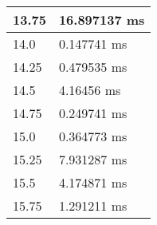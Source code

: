 \begin{multicols}{2}
\begin{tabular}{|l|l|}
		13.75 & 16.897137 ms \\ \hline
		14.0 & 0.147741 ms \\ \hline
		14.25 & 0.479535 ms \\ \hline
		14.5 & 4.16456 ms \\ \hline
		14.75 & 0.249741 ms \\ \hline
		15.0 & 0.364773 ms \\ \hline
		15.25 & 7.931287 ms \\ \hline
		15.5 & 4.174871 ms \\ \hline
		15.75 & 1.291211 ms \\ \hline
	\end{tabular}\\
\end{multicols}\pagebreak